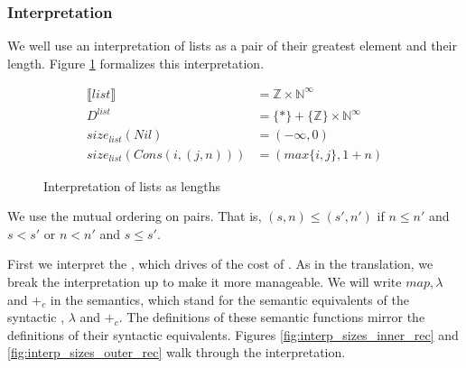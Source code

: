 \subsubsection{Interpretation}
We well use an interpretation of lists as a pair of their greatest element and their length.
Figure \ref{fig:interp_sizes} formalizes this interpretation.
\begin{figure}[H]
  \caption{Interpretation of lists as lengths}
  \label{fig:interp_sizes}
  \begin{align*}
    \llbracket list \rrbracket &= \mathbb{Z} \times \mathbb{N}^\infty \\
    D^{list} &= \{\ast\} + \{\mathbb{Z}\} \times \mathbb{N}^\infty \\
    size_{list} (Nil) &= (-\infty,0) \\
    size_{list} (Cons(i,(j,n))) &= (max\{i,j\},1 + n)
  \end{align*}
\end{figure}
We use the mutual ordering on pairs.
That is, $(s,n) \leq (s',n')$ if $n \leq n'$ and $s < s'$ or $n < n'$ and $s \leq s'$.

First we interpret the , which drives of the cost of .
As in the translation, we break the interpretation up to make it more manageable.
We will write $map, \lambda$ and $+_c$ in the semantics, which stand for the semantic equivalents of the syntactic , $\lambda$ and $+_c$.
The definitions of these semantic functions mirror the definitions of their syntactic equivalents.
Figures \ref{fig:interp_sizes_inner_rec} and \ref{fig:interp_sizes_outer_rec} walk through the interpretation.

